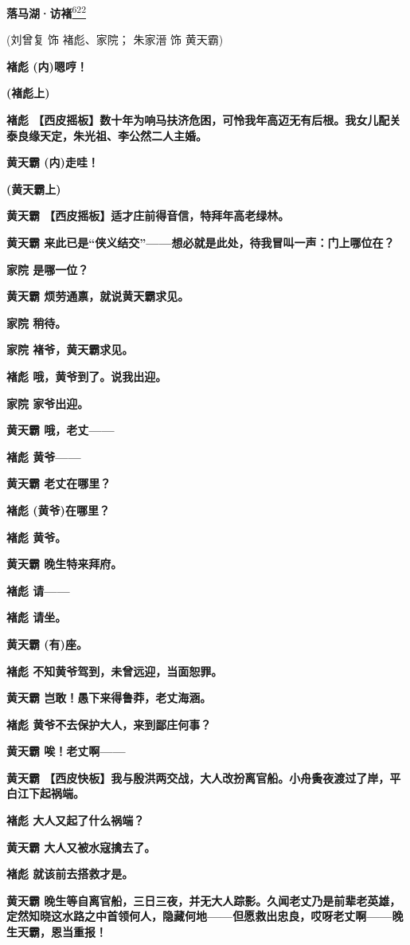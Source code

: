 \textbf{落马湖·访褚}\protect\hyperlink{fn622}{\textsuperscript{622}}

(刘曾复 饰 褚彪、家院； 朱家溍 饰 黄天霸)

\textbf{褚彪 (内)嗯哼！}

\textbf{(褚彪上)}

\textbf{褚彪
【西皮摇板】数十年为响马扶济危困，可怜我年高迈无有后根。我女儿配关泰良缘天定，朱光祖、李公然二人主婚。}

\textbf{黄天霸 (内)走哇！}

\textbf{(黄天霸上)}

\textbf{黄天霸 【西皮摇板】适才庄前得音信，特拜年高老绿林。}

\textbf{黄天霸
来此已是``侠义结交''------想必就是此处，待我冒叫一声：门上哪位在？}

\textbf{家院 是哪一位？}

\textbf{黄天霸 烦劳通禀，就说黄天霸求见。}

\textbf{家院 稍待。}

\textbf{家院 褚爷，黄天霸求见。}

\textbf{褚彪 哦，黄爷到了。说我出迎。}

\textbf{家院 家爷出迎。}

\textbf{黄天霸 哦，老丈------}

\textbf{褚彪 黄爷------}

\textbf{黄天霸 老丈在哪里？}

\textbf{褚彪 (黄爷)在哪里？}

\textbf{褚彪 黄爷。}

\textbf{黄天霸 晚生特来拜府。}

\textbf{褚彪 请------}

\textbf{褚彪 请坐。}

\textbf{黄天霸 (有)座。}

\textbf{褚彪 不知黄爷驾到，未曾远迎，当面恕罪。}

\textbf{黄天霸 岂敢！愚下来得鲁莽，老丈海涵。}

\textbf{褚彪 黄爷不去保护大人，来到鄙庄何事？}

\textbf{黄天霸 唉！老丈啊------}

\textbf{黄天霸
【西皮快板】我与殷洪两交战，大人改扮离官船。小舟夤夜渡过了岸，平白江下起祸端。}

\textbf{褚彪 大人又起了什么祸端？}

\textbf{黄天霸 大人又被水寇擒去了。}

\textbf{褚彪 就该前去搭救才是。}

\textbf{黄天霸
晚生等自离官船，三日三夜，并无大人踪影。久闻老丈乃是前辈老英雄，定然知晓这水路之中首领何人，隐藏何地------但愿救出忠良，哎呀老丈啊------晚生天霸，恩当重报！}


